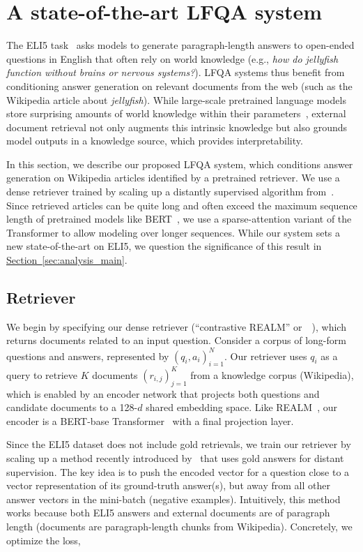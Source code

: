 \documentclass[11pt]{article}
\newcommand{\namedref}[2]{\hyperref[#2]{#1~\ref*{#2}}}
\newcommand{\sectionref}[1]{\namedref{Section}{#1}}
\newcommand{\retriever}[1]{\textsc{c-REALM}}
\begin{document}
 \section{A state-of-the-art LFQA system}\label{sec:model}
The ELI5 task~\citep{fan-etal-2019-eli5} asks models to generate paragraph-length answers to open-ended questions in English that often rely on world knowledge (e.g., \textit{how do jellyfish function without brains or nervous systems?}). LFQA systems thus benefit from conditioning answer generation on relevant documents from the web (such as the Wikipedia article about \textit{jellyfish}). While large-scale pretrained language models store surprising amounts of world knowledge within their parameters~\citep{petroni2019language, roberts2020much}, external document retrieval not only augments this intrinsic knowledge but also grounds model outputs in a knowledge source, which provides interpretability.

In this section, we describe our proposed LFQA system, which conditions answer generation on Wikipedia articles identified by a pretrained retriever. We use a dense retriever trained by scaling up a distantly supervised algorithm from~\citet{jernite2020}. Since retrieved articles can be quite long and often exceed the maximum sequence length of pretrained models like BERT~\citep{devlin-etal-2019-bert}, we use a sparse-attention variant of the Transformer to allow modeling over longer sequences. While our system sets a new state-of-the-art on ELI5, we question the significance of this result in \sectionref{sec:analysis_main}.

\subsection{Retriever}
We begin by specifying our dense retriever (``contrastive REALM'' or~\retriever~), which returns documents related to an input question.
Consider a corpus of long-form questions and answers, represented by $(q_i, a_i)^N_{i=1}$. Our retriever uses $q_i$ as a query to retrieve $K$ documents $(r_{i,j})_{j=1}^K$ from a knowledge corpus (Wikipedia), which is enabled by an encoder network that projects both questions and candidate documents to a 128-$d$ shared embedding space. Like REALM~\citep{guu2020realm}, our encoder is a BERT-base Transformer~\citep{devlin-etal-2019-bert} with a final projection layer. 

Since the ELI5 dataset does not include gold retrievals, we train our retriever by scaling up a method recently introduced by~\citet{jernite2020} that uses gold answers for distant supervision. The key idea is to push the encoded vector for a question close to a vector representation of its ground-truth answer(s), but away from all other answer vectors in the mini-batch (negative examples). Intuitively, this method works because both ELI5 answers and external documents are of paragraph length (documents are paragraph-length chunks from Wikipedia). Concretely, we optimize the loss,
\end{document}
